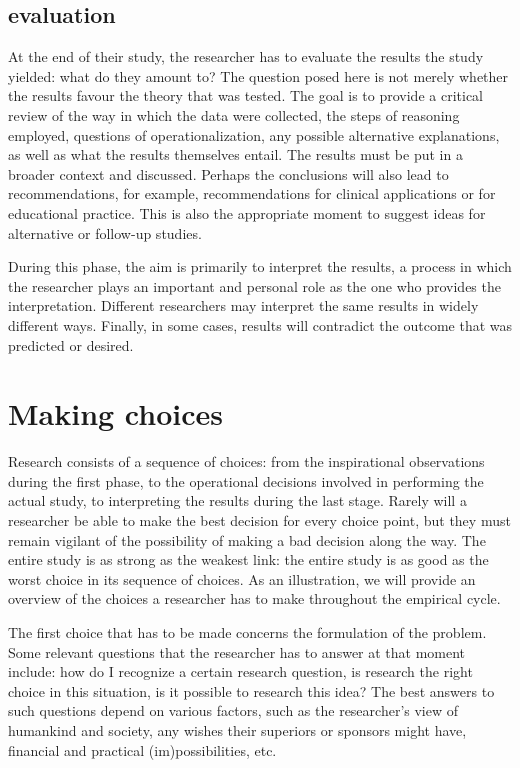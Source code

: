 \documentclass[
]{book}
\begin{document}
\hypertarget{evaluation}{%
\subsection{evaluation}\label{evaluation}}

At the end of their study, the researcher has to evaluate the results the study yielded: what do they amount to? The question posed here is not merely whether the results favour the theory that was tested. The goal is to provide a critical review of the way in which the data were collected, the steps of reasoning employed, questions of operationalization, any possible alternative explanations, as well as what the results themselves entail. The results must be put in a broader context and discussed. Perhaps the conclusions will also lead to recommendations, for example, recommendations for clinical applications or for educational practice. This is also the appropriate moment to suggest ideas for alternative or follow-up studies.

During this phase, the aim is primarily to interpret the results, a process in which the researcher plays an important and personal role as the one who provides the interpretation. Different researchers may interpret the same results in widely different ways. Finally, in some cases, results will contradict the outcome that was predicted or desired.

\hypertarget{sec:makingchoices}{%
\section{Making choices}\label{sec:makingchoices}}

Research consists of a sequence of choices: from the inspirational observations during the first phase, to the operational decisions involved in performing the actual study, to interpreting the results during the last stage. Rarely will a researcher be able to make the best decision for every choice point, but they must remain vigilant of the possibility of making a bad decision along the way. The entire study is as strong as the weakest link: the entire study is as good as the worst choice in its sequence of choices. As an illustration, we will provide an overview of the choices a researcher has to make throughout the empirical cycle.

The first choice that has to be made concerns the formulation of the problem. Some relevant questions that the researcher has to answer at that moment include: how do I recognize a certain research question, is research the right choice in this situation, is it possible to research this idea? The best answers to such questions depend on various factors, such as the researcher's view of humankind and society, any wishes their superiors or sponsors might have, financial and practical (im)possibilities, etc.
\end{document}
